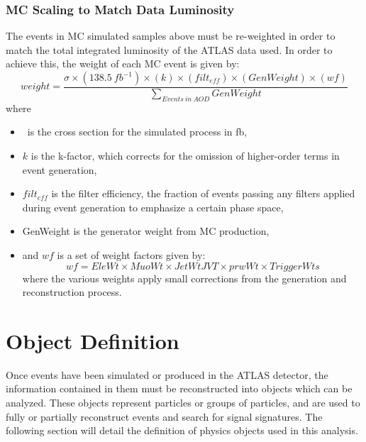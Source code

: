 \subsubsection{MC Scaling to Match Data Luminosity}
\label{subsubsection:mc_scaling}
The events in MC simulated samples above must be re-weighted in order to match the total integrated luminosity of the ATLAS data used. In order to achieve this, the weight of each MC event is given by:
\begin{equation}
weight  = \frac{ \sigma \times (138.5~fb^{-1}) \times (k) \times (filt_{eff}) \times (GenWeight) \times (wf)}{\sum_{Events~in~AOD} GenWeight }
\end{equation}
where
\begin{itemize}
\item \sigma~is the cross section for the simulated process in fb,
\item $k$ is the k-factor, which corrects for the omission of higher-order terms in event generation,
\item $filt_{eff}$ is the filter efficiency, the fraction of events passing any filters applied during event generation to emphasize a certain phase space,
\item GenWeight is the generator weight from MC production,
\item and $wf$ is a set of weight factors given by:
\begin{equation}
wf = EleWt \times MuoWt \times JetWtJVT \times prwWt
 \times TriggerWts \end{equation}
where the various weights apply small corrections from the generation and reconstruction process.
\end{itemize}


\section{Object Definition}
\label{section:objects}
Once events have been simulated or produced in the ATLAS detector, the information contained in them must be reconstructed into objects which can be analyzed. These objects represent particles or groups of particles, and are used to fully or partially reconstruct events and search for signal signatures. The following section will detail the definition of physics objects used in this analysis.

